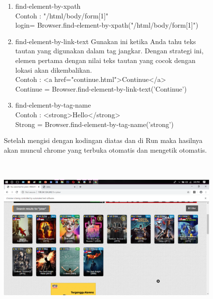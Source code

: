 \documentclass{book}
\begin{document}
\begin{enumerate}
\begin{figure}
\begin{itemize}
\begin{enumerate}
        \item find-element-by-xpath\\
        Contoh : "/html/body/form[1]" \\
        login= Browser.find-element-by-xpath("/html/body/form[1]")

        \item find-element-by-link-text
        \newline Gunakan ini ketika Anda tahu teks tautan yang digunakan dalam tag jangkar. Dengan strategi ini, elemen pertama dengan nilai teks tautan yang cocok dengan lokasi akan dikembalikan. \\
        Contoh : <a href="continue.html">Continue</a>\\
        Continue = Browser.find-element-by-link-text('Continue') 

        \item find-element-by-tag-name\\
        Contoh  : <strong>Hello</strong> \\
        Strong = Browser.find-element-by-tag-name('strong')\\
        \end{enumerate}
    \end{itemize}
    \item Setelah mengisi dengan kodingan diatas dan di Run maka hasilnya akan muncul chrome yang terbuka otomatis dan mengetik otomatis.\\
    \centerline{\includegraphics [width=14.71cm, height=8.27cm]{figures/4.3.png}}\\
\end{figure}
\end{enumerate}
\end{document}
